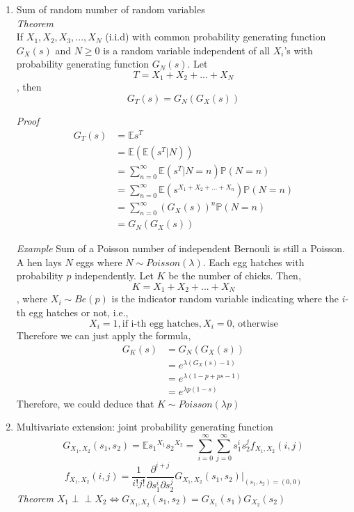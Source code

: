 \documentclass[11pt]{article}
\newcommand{\indep}{\perp \!\!\! \perp}
\begin{document}
\begin{enumerate}
\item Sum of random number of random variables\\
\textit{Theorem}\\
 If $X_1, X_2, X_3, ..., X_N$ (i.i.d) with common probability generating function $G_X(s)$ and $N \geq 0$ is a random variable independent of all $X_i$'s with probability generating function $G_N(s)$. Let $$T = X_1 + X_2 +...+X_N$$, then $$G_{T}(s) = G_{N}(G_{X}(s))$$
 
 \textit{Proof}
 \begin{align*}
 G_{T}(s)&= \mathbb{E}s^{T}\\
 &= \mathbb{E}(\mathbb{E}(s^T |N))\\
 &= \sum_{n=0}^{\infty} \mathbb{E}(s^T |N=n) \mathbb{P}(N=n)\\
 &= \sum_{n=0}^{\infty} \mathbb{E}(s^{X_1 + X_2 +...+X_n}) \mathbb{P}(N=n)\\
 &= \sum_{n=0}^{\infty} (G_X(s))^n \mathbb{P}(N=n)\\
 &= G_{N}(G_X(s))
 \end{align*}
 
 \textit{Example} Sum of a Poisson number of independent Bernouli is still a Poisson.\\
 A hen lays $N$ eggs where $N \sim Poisson(\lambda)$. Each egg hatches with probability $p$ independently. Let $K$ be the number of chicks. Then, $$K = X_1 + X_2 + ...+X_N$$, where $X_i \sim Be(p)$ is the indicator random variable indicating where the $i$-th egg hatches or not, i.e.,$$X_i = 1, \text{if i-th egg hatches}, X_i = 0 \text{, otherwise}$$
 Therefore we can just apply the formula,
 \begin{align*}
 G_K(s) &= G_N(G_X(s))\\
 &= e^{\lambda (G_X(s) -1)}\\
 &= e^{\lambda (1-p+ps -1)}\\
  &= e^{\lambda p(1-s)}
 \end{align*}
Therefore, we could deduce that $K \sim Poisson(\lambda p)$

\item Multivariate extension: joint probability generating function
$$G_{X_1,X_2}(s_1, s_2) = \mathbb{E}{s_{1}}^{X_1}{s_{2}}^{X_2} = \sum_{i=0}^{\infty} \sum_{j=0}^{\infty} s_1 ^{i} s_2 ^{j} f_{X_1, X_2}(i, j)$$
$$f_{X_1, X_2}(i,j) = \dfrac{1}{i!j!} \dfrac{\partial^{i+j}}{\partial s_1 ^i \partial s_2 ^j}G_{X_1, X_2}(s_1, s_2)|_{(s_1,s_2)=(0,0)}$$
\textit{Theorem} $X_1 \indep X_2 \iff G_{X_1, X_2}(s_1, s_2)=G_{X_1}(s_1)G_{X_2}(s_2)$


\end{enumerate}
\end{document}
